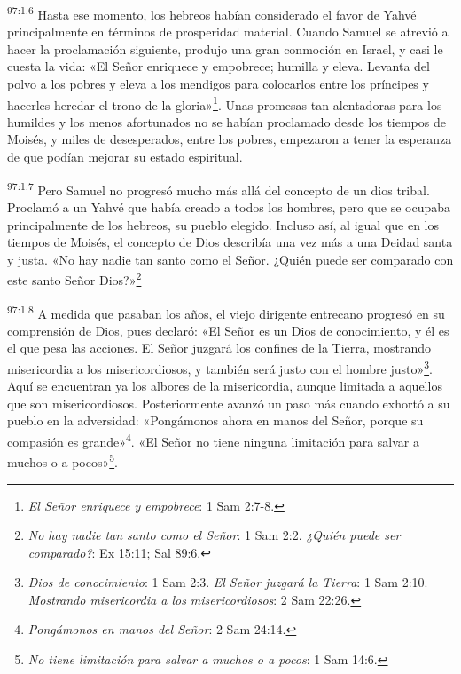 \par
\textsuperscript{97:1.6} Hasta ese momento, los hebreos habían considerado el favor de Yahvé principalmente en términos de prosperidad material. Cuando Samuel se atrevió a hacer la proclamación siguiente, produjo una gran conmoción en Israel, y casi le cuesta la vida: «El Señor enriquece y empobrece; humilla y eleva. Levanta del polvo a los pobres y eleva a los mendigos para colocarlos entre los príncipes y hacerles heredar el trono de la gloria»\footnote{\textit{El Señor enriquece y empobrece}: 1 Sam 2:7-8.}. Unas promesas tan alentadoras para los humildes y los menos afortunados no se habían proclamado desde los tiempos de Moisés, y miles de desesperados, entre los pobres, empezaron a tener la esperanza de que podían mejorar su estado espiritual.

\par
\textsuperscript{97:1.7} Pero Samuel no progresó mucho más allá del concepto de un dios tribal. Proclamó a un Yahvé que había creado a todos los hombres, pero que se ocupaba principalmente de los hebreos, su pueblo elegido. Incluso así, al igual que en los tiempos de Moisés, el concepto de Dios describía una vez más a una Deidad santa y justa. «No hay nadie tan santo como el Señor. ¿Quién puede ser comparado con este santo Señor Dios?»\footnote{\textit{No hay nadie tan santo como el Señor}: 1 Sam 2:2. \textit{¿Quién puede ser comparado?}: Ex 15:11; Sal 89:6.}

\par
\textsuperscript{97:1.8} A medida que pasaban los años, el viejo dirigente entrecano progresó en su comprensión de Dios, pues declaró: «El Señor es un Dios de conocimiento, y él es el que pesa las acciones. El Señor juzgará los confines de la Tierra, mostrando misericordia a los misericordiosos, y también será justo con el hombre justo»\footnote{\textit{Dios de conocimiento}: 1 Sam 2:3. \textit{El Señor juzgará la Tierra}: 1 Sam 2:10. \textit{Mostrando misericordia a los misericordiosos}: 2 Sam 22:26.}. Aquí se encuentran ya los albores de la misericordia, aunque limitada a aquellos que son misericordiosos. Posteriormente avanzó un paso más cuando exhortó a su pueblo en la adversidad: «Pongámonos ahora en manos del Señor, porque su compasión es grande»\footnote{\textit{Pongámonos en manos del Señor}: 2 Sam 24:14.}. «El Señor no tiene ninguna limitación para salvar a muchos o a pocos»\footnote{\textit{No tiene limitación para salvar a muchos o a pocos}: 1 Sam 14:6.}.

